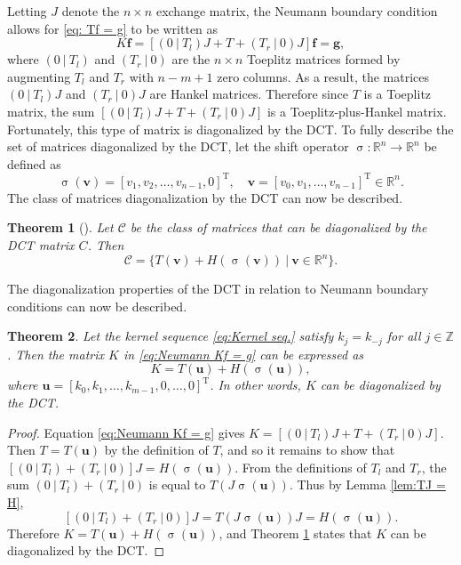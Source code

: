 \documentclass[12pt,notitlepage]{report}
\newcommand{\gVec}{\mathbf{g}}	%
\newcommand{\fVec}{\mathbf{f}}	%
\newcommand{\trans}{\mathrm{T}}	%
\DeclareMathOperator{\shift}{\sigma}	%
\newtheorem{theorem}{Theorem}[section]
\begin{document}
Letting $J$ denote the $n \times n$ exchange matrix, the Neumann boundary condition allows for \eqref{eq: Tf = g} to be written as
\begin{equation}
\label{eq:Neumann Kf = g}
K\fVec = [(0~|~T_{l})J + T + (T_{r}~|~0)J]\fVec = \gVec,
\end{equation}
where $(0~|~T_{l})$ and $(T_{r}~|~0)$ are the $n \times n$ Toeplitz matrices formed by augmenting $T_{l}$ and $T_{r}$ with $n-m+1$ zero columns. As a result, the matrices $(0~|~T_{l})J$ and $(T_{r}~|~0)J$ are Hankel matrices. Therefore since $T$ is a Toeplitz matrix, the sum $[(0~|~T_{l})J + T + (T_{r}~|~0)J]$ is a Toeplitz-plus-Hankel matrix. Fortunately, this type of matrix is diagonalized by the DCT. To fully describe the set of matrices diagonalized by the DCT, let the shift operator $\shift: \mathbb{R}^n \rightarrow \mathbb{R}^n$ be defined as
\[\shift(\mathbf{v}) = [v_1,v_2,\ldots,v_{n-1},0]^\trans, \quad \mathbf{v} = [v_0,v_1,\ldots,v_{n-1}]^\trans \in \mathbb{R}^n.\] 
The class of matrices diagonalization by the DCT can now be described.
\begin{theorem}[{{\cite{ChanChanWong,KailathOlshevsky1996,Martucci1994,Sanchez_et_al}}}]
\label{thm:DCT Diagonalization}
Let $\mathcal{C}$ be the class of matrices that can be diagonalized by the DCT matrix $C$. Then
\[\mathcal{C} = \{T(\mathbf{v}) + H\left(\shift(\mathbf{v})\right) ~|~ \mathbf{v} \in \mathbb{R}^n\}.\]
\end{theorem}
The diagonalization properties of the DCT in relation to Neumann boundary conditions can now be described.
\begin{theorem}
\label{thm:Neumann Diagonalization}
Let the kernel sequence \eqref{eq:Kernel seq.} satisfy $k_j = k_{-j}$ for all $j \in \mathbb{Z}$. Then the matrix $K$ in \eqref{eq:Neumann Kf = g} can be expressed as
\[K = T(\mathbf{u}) + H\left(\shift(\mathbf{u})\right),\]
where $\mathbf{u} = [k_0,k_1,\ldots,k_{m-1},0,\ldots,0]^\trans$. In other words, $K$ can be diagonalized by the DCT.
\end{theorem}
\begin{proof}
Equation \eqref{eq:Neumann Kf = g} gives $K = [(0~|~T_{l})J + T + (T_{r}~|~0)J]$. Then $T = T(\mathbf{u})$ by the definition of $T$, and so it remains to show that $[(0~|~T_{l}) + (T_{r}~|~0)]J = H\left(\shift(\mathbf{u})\right)$. From the definitions of $T_{l}$ and $T_{r}$, the sum $(0~|~T_{l}) + (T_{r}~|~0)$ is equal to $T\left(J\shift(\mathbf{u})\right)$. Thus by Lemma \ref{lem:TJ = H},
\[[(0~|~T_{l}) + (T_{r}~|~0)]J = T\left(J\shift(\mathbf{u})\right)J = H\left(\shift(\mathbf{u})\right).\]
Therefore $K = T(\mathbf{u}) + H\left(\shift(\mathbf{u})\right)$, and Theorem \ref{thm:DCT Diagonalization} states that $K$ can be diagonalized by the DCT. 
\end{proof}
\end{document}
